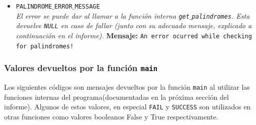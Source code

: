 \documentclass[a4paper, 10pt]{article}
\def\code#1{\texttt{#1}}
\begin{document}
\begin{itemize}
				\item \code{PALINDROME$\_$ERROR$\_$MESSAGE}
				\\\textit{El error se puede dar al llamar a la función interna \code{get$\_$palindromes}.
				Esta devuelve \code{NULL} en caso de fallar (junto con su adecuado mensaje, explicado
				a continuación en el informe).}
					\subitem \textbf{Mensaje:}
						\subsubitem \code{An error ocurred while checking for palindromes!}

			\end{itemize}
		\subsubsection{Valores devueltos por la función \code{main}}
			Los siguientes códigos son mensajes devueltos por la función \code{main} al utilizar las funciones
			internas del programa(documentadas en la próxima sección del informe). Algunos de estos valores,
			en especial \code{FAIL} y \code{SUCCESS} son utilizados en otras funciones como valores booleanos
			False y True respectivamente.
\end{document}
